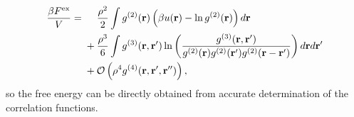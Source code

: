 \documentclass[11pt,twoside]{report}
\begin{document}
\begin{equation*}
  \begin{split}
    \frac{\beta F^\mathrm{ex}}{V}
    =& \; \hphantom{ + } \;\,
    \frac{\rho^2}{2} \int g^{(2)}(\vec{r})
    \left( \beta u(\vec{r}) - \ln{g^{(2)}(\vec{r})} \right)
    d\vec{r}
    \\ & \;
    + \frac{\rho^3}{6}
    \int g^{(3)}(\vec{r}, \vec{r}')
    \ln{\left(
      \frac{
        g^{(3)}(\vec{r}, \vec{r}')
      }{
        g^{(2)}(\vec{r}) g^{(2)}(\vec{r}') g^{(2)}(\vec{r} - \vec{r}')
      }
      \right)}
    \, d\vec{r} d\vec{r}'
    \\ & \;
    + \mathcal{O}\left( \rho^4 g^{(4)}(\vec{r}, \vec{r}', \vec{r}'') \right),
  \end{split}
\end{equation*}
so the free energy can be directly obtained from accurate determination of the correlation functions.

\end{document}
